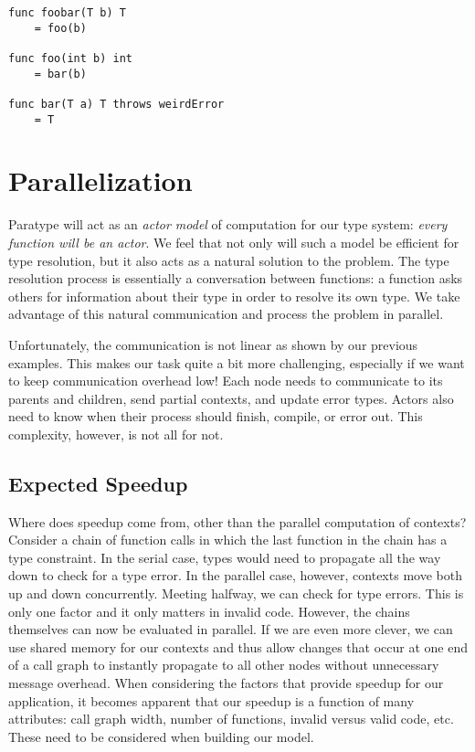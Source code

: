 \documentclass{acm_proc_article-sp}
\begin{document}
\begin{lstlisting}[caption=Errors,language=Paratype,label=lst:errors]
func foobar(T b) T
    = foo(b)

func foo(int b) int
    = bar(b)

func bar(T a) T throws weirdError
    = T
\end{lstlisting}


\section{Parallelization}

Paratype will act as an \emph{actor model} of computation for our type
system: \emph{every function will be an actor}. We feel that not only will
such a model be efficient for type resolution, but it also acts as a
natural solution to the problem. The type resolution process is
essentially a conversation between functions: a function asks others for
information about their type in order to resolve its own type. We take
advantage of this natural communication and process the problem in
parallel.

Unfortunately, the communication is not linear as shown by our
previous examples. This makes our task quite a bit more challenging,
especially if we want to keep communication overhead low! Each node
needs to communicate to its parents and children, send partial
contexts, and update error types. Actors also need to know when their
process should finish, compile, or error out. This complexity,
however, is not all for not.

\subsection{Expected Speedup}

Where does speedup come from, other than the parallel computation of
contexts? Consider a chain of function calls in which the last
function in the chain has a type constraint. In the serial case, types
would need to propagate all the way down to check for a type error. In
the parallel case, however, contexts move both up and down
concurrently. Meeting halfway, we can check for type errors. This
is only one factor and it only matters in invalid code. However, the
chains themselves can now be evaluated in parallel. If we are even
more clever, we can use shared memory for our contexts and thus allow
changes that occur at one end of a call graph to instantly propagate
to all other nodes without unnecessary message overhead. When
considering the factors that provide speedup for our application, it
becomes apparent that our speedup is a function of many attributes:
call graph width, number of functions, invalid versus valid code, etc.
These need to be considered when building our model.
\end{document}
